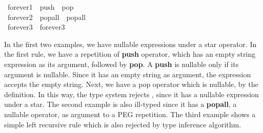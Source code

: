 \documentclass[sigplan,screen]{acmart}
\theoremstyle{definition}
\begin{document}
\begin{tabbing}\ttfamily
~forever1~~push~~pop\\
\ttfamily ~forever2~~popall~~popall\\
\ttfamily ~forever3~~forever3
\end{tabbing}
In the first two examples, we have nullable expressions under a star
operator. In the first rule, we have a repetition of \textbf{push} operator, which
has an empty string expression as its argument, followed by \textbf{pop}.
A \textbf{push} is nullable only if its argument is nullable. Since it
has an empty string as argument, the expression 
accepts the empty string. Next, we have a pop operator which is nullable,
by the definition. In this way, the type system rejects ,
since it has a nullable expression under a star. The second example is also
ill-typed since it has a \textbf{popall}, a nullable operator, as
argument to a PEG repetition.
The third example shows a simple left recursive rule
which is also rejected by type inference algorithm.

%
%
%
\end{document}
